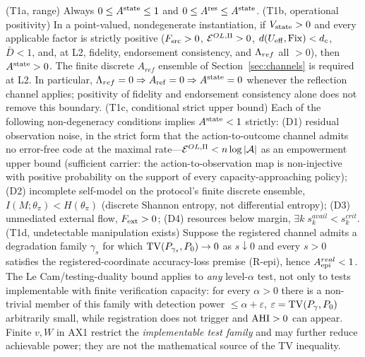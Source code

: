 \begin{theorem}[T1a--d]\label{thm:t1}
\textup{(T1a, range)} Always $0\le A^{\mathrm{state}}\le1$ and $0\le A^{\mathrm{res}}\le A^{\mathrm{state}}$.
\textup{(T1b, operational positivity)} In a point-valued, nondegenerate
instantiation, if $V_{\mathrm{state}}>0$ and every applicable factor is strictly positive
($F_{\mathrm{src}}>0$, $\mathcal{E}^{OL,\Pi}>0$, $d(U_{\mathrm{eff}},\mathrm{Fix})<d_{c}$, $\bar D<1$, and, at L2,
fidelity, endorsement consistency, and $\Lambda_{ref}$ all $>0$), then $A^{\mathrm{state}}>0$.
The finite discrete $A_{ref}$ ensemble of Section~\ref{sec:channels} is
required at L2. In particular, $\Lambda_{ref}=0\Rightarrow A_{\mathrm{ref}}=0\Rightarrow A^{\mathrm{state}}=0$
whenever the reflection channel applies; positivity of fidelity and
endorsement consistency alone does not remove this boundary.
\textup{(T1c, conditional strict upper bound)} Each of the following
non-degeneracy conditions implies $A^{\mathrm{state}}<1$ strictly: \textup{(D1)} residual
observation noise, in the strict form that the action-to-outcome channel
admits no error-free code at the maximal rate---$\mathcal{E}^{OL,\Pi}<n\log|\mathcal{A}|$ as an
empowerment upper bound (sufficient carrier: the action-to-observation map is
non-injective with positive probability on the support of every
capacity-approaching policy); \textup{(D2)} incomplete self-model on the protocol's finite discrete ensemble,
$I(M;\theta_\pi)<H(\theta_\pi)$ (discrete Shannon entropy, not differential
entropy); \textup{(D3)} unmediated external flow,
$F_{\mathrm{ext}}>0$; \textup{(D4)} resources below margin, $\exists k\;
s_k^{avail}<s_k^{crit}$.
\textup{(T1d, undetectable manipulation exists)} Suppose the registered
channel admits a degradation family $\gamma_s$ for which
$\mathrm{TV}(P_{\gamma_s},P_0)\to0$ as $s\downarrow0$ and every $s>0$ satisfies the
registered-coordinate accuracy-loss premise \textup{(R-epi)}, hence
$A_{\mathrm{epi}}^{real}<1$. The Le Cam/testing-duality bound applies to \emph{any}
level-$\alpha$ test, not only to tests implementable with finite verification
capacity: for every $\alpha>0$ there is a non-trivial member of this family
with detection power $\le\alpha+\varepsilon$,
$\varepsilon=\mathrm{TV}(P_\gamma,P_0)$ arbitrarily small, while registration does not
trigger and $\mathrm{AHI}>0$ can appear. Finite $v,W$ in AX1 restrict the
\emph{implementable test family} and may further reduce achievable power; they
are not the mathematical source of the TV inequality.
\end{theorem}

